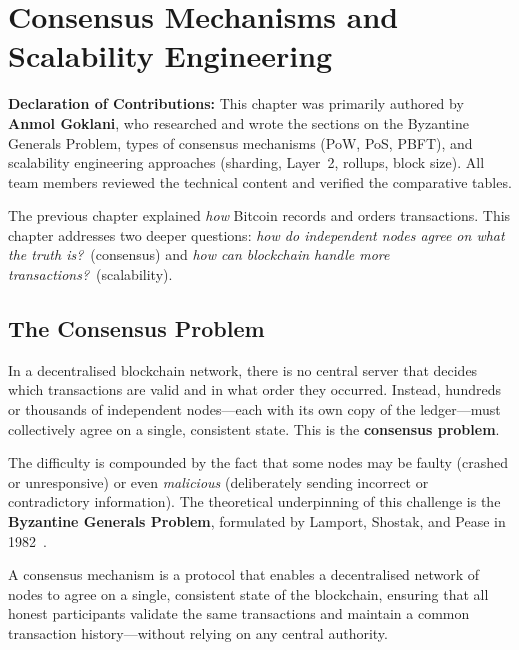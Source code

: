 \chapter{Consensus Mechanisms and Scalability Engineering}
\label{ch:consensus}

\noindent\textbf{Declaration of Contributions:} This chapter was primarily authored by \textbf{Anmol Goklani}, who researched and wrote the sections on the Byzantine Generals Problem, types of consensus mechanisms (PoW, PoS, PBFT), and scalability engineering approaches (sharding, Layer~2, rollups, block size). All team members reviewed the technical content and verified the comparative tables.

\bigskip

The previous chapter explained \emph{how} Bitcoin records and orders transactions. This chapter addresses two deeper questions: \emph{how do independent nodes agree on what the truth is?}\ (consensus) and \emph{how can blockchain handle more transactions?}\ (scalability).

\section{The Consensus Problem}
\label{sec:consensus-problem}

In a decentralised blockchain network, there is no central server that decides which transactions are valid and in what order they occurred. Instead, hundreds or thousands of independent nodes---each with its own copy of the ledger---must collectively agree on a single, consistent state. This is the \textbf{consensus problem}.

The difficulty is compounded by the fact that some nodes may be faulty (crashed or unresponsive) or even \emph{malicious} (deliberately sending incorrect or contradictory information). The theoretical underpinning of this challenge is the \textbf{Byzantine Generals Problem}, formulated by Lamport, Shostak, and Pease in 1982~\cite{lamport1982byzantine}.

\begin{definition}
\label{def:consensus}
A consensus mechanism is a protocol that enables a decentralised network of nodes to agree on a single, consistent state of the blockchain, ensuring that all honest participants validate the same transactions and maintain a common transaction history---without relying on any central authority.
\end{definition}

